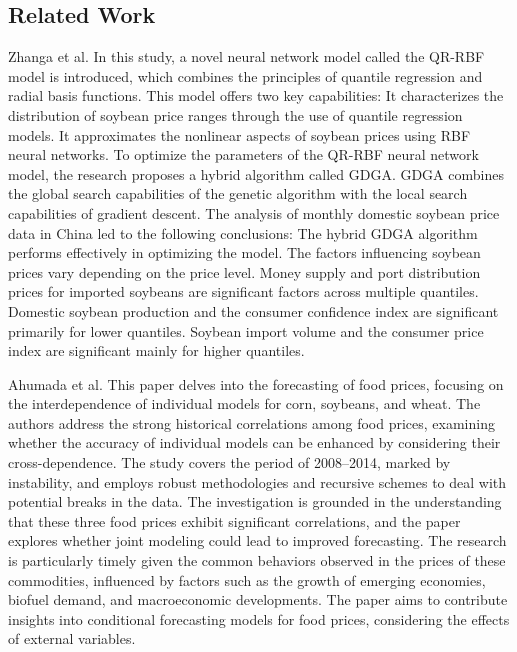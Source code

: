     \subsection{Related Work}
    
        Zhanga et al. \cite{zhang2018} In this study, a novel neural network model called the QR-RBF model is introduced, which combines the principles of quantile regression and radial basis functions. This model offers two key capabilities:
        It characterizes the distribution of soybean price ranges through the use of quantile regression models.
        It approximates the nonlinear aspects of soybean prices using RBF neural networks.
        To optimize the parameters of the QR-RBF neural network model, the research proposes a hybrid algorithm called GDGA. GDGA combines the global search capabilities of the genetic algorithm with the local search capabilities of gradient descent.
        The analysis of monthly domestic soybean price data in China led to the following conclusions:
        The hybrid GDGA algorithm performs effectively in optimizing the model.
        The factors influencing soybean prices vary depending on the price level.
        Money supply and port distribution prices for imported soybeans are significant factors across multiple quantiles.
        Domestic soybean production and the consumer confidence index are significant primarily for lower quantiles.
        Soybean import volume and the consumer price index are significant mainly for higher quantiles.
        
        Ahumada et al. \cite{ahumada2016} This paper delves into the forecasting of food prices, focusing on the interdependence of individual models for corn, soybeans, and wheat. The authors address the strong historical correlations among food prices, examining whether the accuracy of individual models can be enhanced by considering their cross-dependence. The study covers the period of 2008–2014, marked by instability, and employs robust methodologies and recursive schemes to deal with potential breaks in the data. The investigation is grounded in the understanding that these three food prices exhibit significant correlations, and the paper explores whether joint modeling could lead to improved forecasting. The research is particularly timely given the common behaviors observed in the prices of these commodities, influenced by factors such as the growth of emerging economies, biofuel demand, and macroeconomic developments. The paper aims to contribute insights into conditional forecasting models for food prices, considering the effects of external variables. 
        
